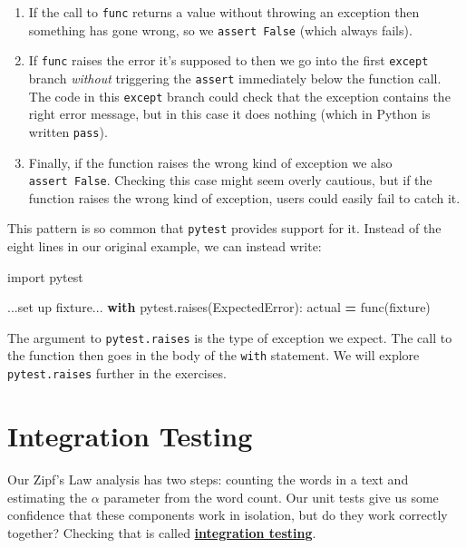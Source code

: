 \documentclass[
]{krantz}
\makeatletter
\newenvironment{Shaded}{\begin{snugshade}}{\end{snugshade}}
\newcommand{\BuiltInTok}[1]{#1}
\newcommand{\ControlFlowTok}[1]{\textcolor[rgb]{0.13,0.29,0.53}{\textbf{#1}}}
\newcommand{\ImportTok}[1]{#1}
\newcommand{\NormalTok}[1]{#1}
\newcommand{\OperatorTok}[1]{\textcolor[rgb]{0.81,0.36,0.00}{\textbf{#1}}}
\newenvironment{kframe}{%
\medskip{}
\setlength{\fboxsep}{.8em}
 \def\at@end@of@kframe{}%
 \ifinner\ifhmode%
  \def\at@end@of@kframe{\end{minipage}}%
  \begin{minipage}{\columnwidth}%
 \fi\fi%
 \def\FrameCommand##1{\hskip\@totalleftmargin \hskip-\fboxsep
 \colorbox{shadecolor}{##1}\hskip-\fboxsep
     \hskip-\linewidth \hskip-\@totalleftmargin \hskip\columnwidth}%
 \MakeFramed {\advance\hsize-\width
   \@totalleftmargin\z@ \linewidth\hsize
   \@setminipage}}%
 {\par\unskip\endMakeFramed%
 \at@end@of@kframe}
\renewenvironment{Shaded}{\begin{kframe}}{\end{kframe}}
\newcommand{\gref}[2]{\hyperlink{#2}{\textbf{#1}}}
\makeatother
\begin{document}
\begin{enumerate}
\def\labelenumi{\arabic{enumi}.}
\item
  If the call to \texttt{func} returns a value without throwing an exception
  then something has gone wrong,
  so we \texttt{assert\ False} (which always fails).
\item
  If \texttt{func} raises the error it's supposed to
  then we go into the first \texttt{except} branch
  \emph{without} triggering the \texttt{assert} immediately below the function call.
  The code in this \texttt{except} branch could check that
  the exception contains the right error message,
  but in this case it does nothing
  (which in Python is written \texttt{pass}).
\item
  Finally,
  if the function raises the wrong kind of exception
  we also \texttt{assert\ False}.
  Checking this case might seem overly cautious,
  but if the function raises the wrong kind of exception,
  users could easily fail to catch it.
\end{enumerate}

This pattern is so common that \texttt{pytest} provides support for it.
Instead of the eight lines in our original example,
we can instead write:

\begin{Shaded}
\begin{Highlighting}[]
\ImportTok{import}\NormalTok{ pytest}

\NormalTok{...}\BuiltInTok{set}\NormalTok{ up fixture...}
\ControlFlowTok{with}\NormalTok{ pytest.raises(ExpectedError):}
\NormalTok{    actual }\OperatorTok{=}\NormalTok{ func(fixture)}
\end{Highlighting}
\end{Shaded}

The argument to \texttt{pytest.raises} is the type of exception we expect.
The call to the function then goes in the body of the \texttt{with} statement.
We will explore \texttt{pytest.raises} further in the exercises.

\hypertarget{testing-integration}{%
\section{Integration Testing}\label{testing-integration}}

Our Zipf's Law analysis has two steps:
counting the words in a text
and estimating the \(\alpha\) parameter from the word count.
Our unit tests give us some confidence that these components work in isolation,
but do they work correctly together?
Checking that is called \gref{integration testing}{integration\_test}.
\end{document}
